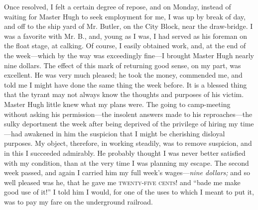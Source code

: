 Once resolved, I felt a certain degree of repose, and on Monday, instead
of waiting for Master Hugh to seek employment for me, I was up by break
of day, and off to the ship yard of Mr. Butler, on the City Block, near
the draw-bridge. I was a favorite with Mr. B., and, young as I was, I
had served as his foreman on the float stage, at calking. Of course, I
easily obtained work, and, at the end of the week---which by the way was
exceedingly fine---I brought Master Hugh nearly nine dollars. The effect
of this mark of returning good sense, on my part, was excellent. He was
very much pleased; he took the money, commended me, and told me I might
have done the same thing the week before. It is a blessed thing that the
tyrant may not always know the thoughts and purposes of his victim.
Master Hugh little knew what my plans were. The going to camp-meeting
without asking his permission---the insolent answers made to his
reproaches---the sulky deportment the week after being deprived of the
privilege of hiring my time---had awakened in him the suspicion that I
might be cherishing disloyal purposes. My object, therefore, in working
steadily, {\protect\hypertarget{333}{}{}}was to remove suspicion, and in
this I succeeded admirably. He probably thought I was never better
satisfied with my condition, than at the very time I was planning my
escape. The second week passed, and again I carried him my full week's
wages---\emph{nine dollars;} and so well pleased was he, that he gave me
\textsc{twenty-five cents}! and ``bade me make good use of it!'' I told
him I would, for one of the uses to which I meant to put it, was to pay
my fare on the underground railroad.

